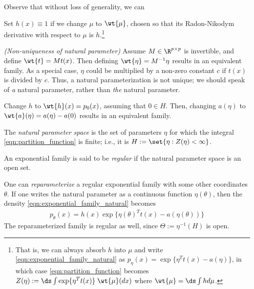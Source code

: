\begin{remark}
Observe \cite{chuaXXXXstats} that without loss of generality, we can 
\begin{alphabate} 
\item Set $h(x) \equiv 1$ if we change $\mu$ to $\wt{\mu}$, chosen so that its Radon-Nikodym derivative with respect to $\mu$ is $h$.\footnote{That is, we can always absorb $h$ into $\mu$ and write \eqref{eqn:exponential_family_natural} as  $p_\eta(x) = \exp \{ \eta^T t(x) - a(\eta)\}$, in which case \eqref{eqn:partition_function} becomes $Z(\eta) := \ds\int  \exp \{ \eta^T t(x)  \} \; \wt{\mu} (dx) $ where $\wt{\mu} = \ds\int h d\mu$. }
\item \label{rk:nonuniqueness_of_natural_parameter} \textit{(Non-uniqueness of natural parameter)} Assume $M \in \R^{p \times p}$ is invertible, and define $\wt{t} = M t(x)$. Then defining $\wt{\eta} = M^{-1} \eta$ results in an equivalent family.  As a special case, $\eta$ could be multiplied by a non-zero constant $c$ if $t(x)$ is divided by $c$.  Thus, a natural parameterization is not unique; we should speak of \textit{a} natural parameter,  rather than \textit{the} natural parameter.
\item Change $h$ to $\wt{h}(x) = p_0(x)$, assuming that $0 \in H$.  Then, changing $a(\eta)$ to $\wt{a}(\eta) = a(\eta) - a(0)$ results in an equivalent family. 
\end{alphabate}
\label{rk:alternate_constructions_for_the_exponential_family}
\end{remark}


\begin{definition}
The \textit{natural parameter space} is the set of parameters $\eta$ for which the integral \eqref{eqn:partition_function} is finite; i.e., it is $H:=\set{\eta : Z(\eta) < \infty}$.
\end{definition}

\begin{definition}
An exponential family is said to be \textit{regular} if the natural parameter space is an open set.
\end{definition}

One can \textit{reparameterize} a regular exponential family with some other coordinates $\theta$.  If one writes the natural parameter as a continuous function $\eta(\theta)$, then the density \eqref{eqn:exponential_family_natural} becomes
\begin{align}
\label{eqn:exponential_family}
 p_\theta(x) = h(x) \exp \{ \eta(\theta)^T t(x) - a(\eta(\theta))\} 
 \end{align}
 The reparameterized family is regular as well, since $\Theta := \eta^{-1}(H)$ is open. 


